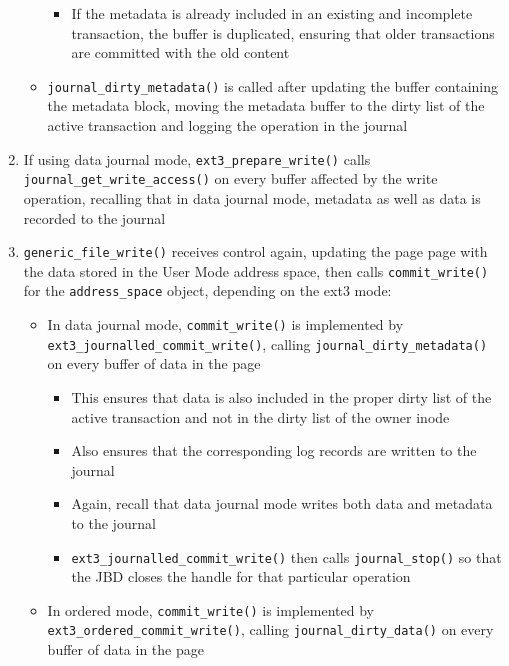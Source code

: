 \begin{enumerate}
\begin{itemize}
			\begin{itemize}
			\item If the metadata is already included in an existing and incomplete transaction, the buffer is duplicated, ensuring that older transactions are committed with the old content
			\end{itemize}
		\item \texttt{journal_dirty_metadata()} is called after updating the buffer containing the metadata block, moving the metadata buffer to the dirty list of the active transaction and logging the operation in the journal
		\end{itemize}
	\item If using data journal mode, \texttt{ext3_prepare_write()} calls \\ \texttt{journal_get_write_access()} on every buffer affected by the write operation, recalling that in data journal mode, metadata as well as data is recorded to the journal
	\item \texttt{generic_file_write()} receives control again, updating the page page with the data stored in the User Mode address space, then calls \texttt{commit_write()} for the \texttt{address_space} object, depending on the ext3 mode:
		\begin{itemize}
		\item In data journal mode, \texttt{commit_write()} is implemented by \\ \texttt{ext3_journalled_commit_write()}, calling \texttt{journal_dirty_metadata()} on every buffer of data in the page
			\begin{itemize}
			\item This ensures that data is also included in the proper dirty list of the active transaction and not in the dirty list of the owner inode
			\item Also ensures that the corresponding log records are written to the journal
			\item Again, recall that data journal mode writes both data and metadata to the journal
			\item \texttt{ext3_journalled_commit_write()} then calls \texttt{journal_stop()} so that the JBD closes the handle for that particular operation
			\end{itemize}
		\item In ordered mode, \texttt{commit_write()} is implemented by \\ \texttt{ext3_ordered_commit_write()}, calling \texttt{journal_dirty_data()} on every buffer of data in the page

\end{itemize}
\end{enumerate}
